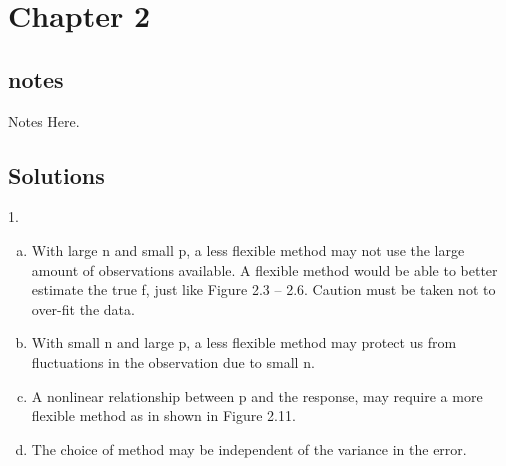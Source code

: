 \documentclass[12pt,twoside,notitlepage]{article}
\begin{document}
\section{Chapter 2}

\subsection{notes}

Notes Here.

\subsection{Solutions}
\setdefaultleftmargin{30pt}{}{}{}{}{}
1.


\begin{enumerate}[(a)]
\setlength\itemindent{20pt}
\item With large n and small p, a less flexible method may not use the large 
  amount of observations available. A flexible method would be able to better 
  estimate the true f, just like Figure 2.3 -- 2.6. Caution must be taken not 
  to over-fit the data.
\item With small n and large p, a less flexible method may protect us from 
fluctuations in the observation due to small n. 
\item A nonlinear relationship between p and the response, may require a more 
  flexible method as in shown in Figure 2.11.
\item The choice of method may be independent of the variance in the error.
\end{enumerate}
\end{document}
